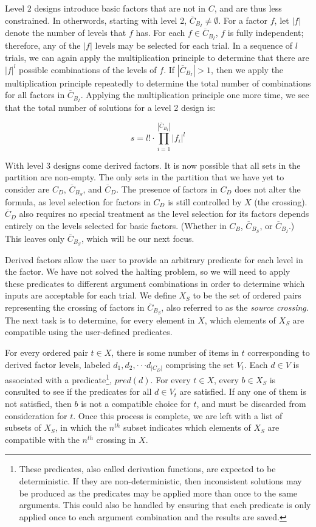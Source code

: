 Level 2 designs introduce basic factors that are not in $C$, and are thus less constrained. In otherwords, starting with level 2, $\overline{C}_{B_I} \neq \emptyset$. For a factor $f$, let $|f|$ denote the number of levels that $f$ has. For each $f \in \overline{C}_{B_I}$, $f$ is fully independent; therefore, any of the $|f|$ levels may be selected for each trial. In a sequence of $l$ trials, we can again apply the multiplication principle to determine that there are $|f|^l$ possible combinations of the levels of $f$. If $|\overline{C}_{B_I}| > 1$, then we apply the multiplication principle repeatedly to determine the total number of combinations for all factors in $\overline{C}_{B_I}$. Applying the multiplication principle one more time, we see that the total number of solutions for a level 2 design is:

\[
s = l! \cdot \prod_{i=1}^{|\overline{C}_{B_I}|} |f_i|^l
\]

With level 3 designs come derived factors. It is now possible that all sets in the partition are non-empty. The only sets in the partition that we have yet to consider are $C_D$, $\overline{C}_{B_S}$, and $\overline{C}_D$. The presence of factors in $C_D$ does not alter the formula, as level selection for factors in $C_D$ is still controlled by $X$ (the crossing). $\overline{C}_D$ also requires no special treatment as the level selection for its factors depends entirely on the levels selected for basic factors. (Whether in $C_B$, $\overline{C}_{B_S}$, or $\overline{C}_{B_I}$.) This leaves only $\overline{C}_{B_S}$, which will be our next focus.

Derived factors allow the user to provide an arbitrary predicate for each level in the factor. We have not solved the halting problem, so we will need to apply these predicates to different argument combinations in order to determine which inputs are acceptable for each trial. We define $X_S$ to be the set of ordered pairs representing the crossing of factors in $\overline{C}_{B_S}$, also referred to as the \textit{source crossing}. The next task is to determine, for every element in $X$, which elements of $X_S$ are compatible using the user-defined predicates.

For every ordered pair $t \in X$, there is some number of items in $t$ corresponding to derived factor levels, labeled $d_1, d_2, \cdot\cdot\cdot d_{|C_D|}$ comprising the set $V_t$. Each $d \in V$ is associated with a predicate\footnote{These predicates, also called derivation functions, are expected to be deterministic. If they are non-deterministic, then inconsistent solutions may be produced as the predicates may be applied more than once to the same arguments. This could also be handled by ensuring that each predicate is only applied once to each argument combination and the results are saved.}, $pred(d)$. For every $t \in X$, every $b \in X_S$ is consulted to see if the predicates for all $d \in V_t$ are satisfied. If any one of them is not satisfied, then $b$ is not a compatible choice for $t$, and must be discarded from consideration for $t$. Once this process is complete, we are left with a list of subsets of $X_S$, in which the $n^{th}$ subset indicates which elements of $X_S$ are compatible with the $n^{th}$ crossing in $X$.


